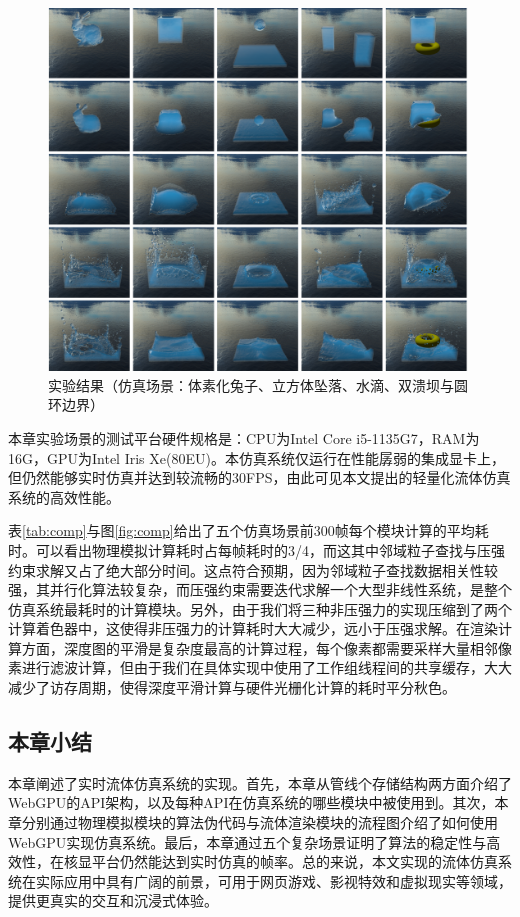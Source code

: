     \begin{figure}
    	\centering
    	\includegraphics[width=0.99\textwidth]{figures/webgpu/demo.png}
    	\caption{实验结果（仿真场景：体素化兔子、立方体坠落、水滴、双溃坝与圆环边界）}
    	\label{fig:result}
    \end{figure}
    
    本章实验场景的测试平台硬件规格是：CPU为Intel Core i5-1135G7，RAM为16G，GPU为Intel Iris Xe(80EU)。本仿真系统仅运行在性能孱弱的集成显卡上，但仍然能够实时仿真并达到较流畅的30FPS，由此可见本文提出的轻量化流体仿真系统的高效性能。
    
    表\ref{tab:comp}与图\ref{fig:comp}给出了五个仿真场景前300帧每个模块计算的平均耗时。可以看出物理模拟计算耗时占每帧耗时的3/4，而这其中邻域粒子查找与压强约束求解又占了绝大部分时间。这点符合预期，因为邻域粒子查找数据相关性较强，其并行化算法较复杂，而压强约束需要迭代求解一个大型非线性系统，是整个仿真系统最耗时的计算模块。另外，由于我们将三种非压强力的实现压缩到了两个计算着色器中，这使得非压强力的计算耗时大大减少，远小于压强求解。在渲染计算方面，深度图的平滑是复杂度最高的计算过程，每个像素都需要采样大量相邻像素进行滤波计算，但由于我们在具体实现中使用了工作组线程间的共享缓存，大大减少了访存周期，使得深度平滑计算与硬件光栅化计算的耗时平分秋色。

\subsection{本章小结}
    本章阐述了实时流体仿真系统的实现。首先，本章从管线个存储结构两方面介绍了WebGPU的API架构，以及每种API在仿真系统的哪些模块中被使用到。其次，本章分别通过物理模拟模块的算法伪代码与流体渲染模块的流程图介绍了如何使用WebGPU实现仿真系统。最后，本章通过五个复杂场景证明了算法的稳定性与高效性，在核显平台仍然能达到实时仿真的帧率。总的来说，本文实现的流体仿真系统在实际应用中具有广阔的前景，可用于网页游戏、影视特效和虚拟现实等领域，提供更真实的交互和沉浸式体验。